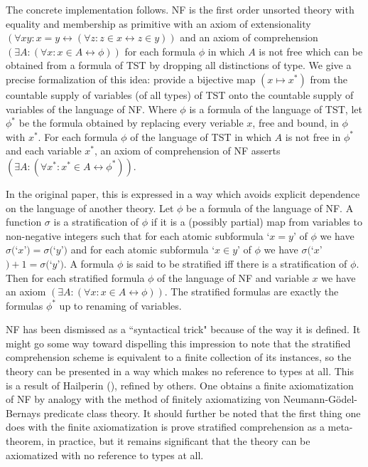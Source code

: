 \documentclass[112pt]{article}
\begin{document}
The concrete implementation follows.  NF is the first order unsorted theory with equality and membership as primitive with an axiom of extensionality $(\forall xy:x=y \leftrightarrow (\forall z:z \in x \leftrightarrow z\in y))$ and an axiom of comprehension $(\exists A:(\forall x:x \in A \leftrightarrow \phi))$ for each formula $\phi$ in which $A$ is not free which can be obtained from a formula of TST by dropping all distinctions of type.  We give a precise formalization of this idea:  provide a bijective map $(x \mapsto x^*)$ from the countable supply of variables (of all types) of TST onto the countable supply of variables of the language of NF.  Where $\phi$ is a formula of the language of TST, let $\phi^*$ be the formula obtained by replacing every veriable $x$, free and bound,
in $\phi$ with $x^*$. For each formula $\phi$ of the language of TST in which $A$ is not free in $\phi^*$ and each variable $x^*$, an axiom of comprehension of NF asserts $(\exists A:(\forall x^*:x^* \in A \leftrightarrow \phi^*))$.

In the original paper, this is expressed in a way which avoids explicit dependence on the language of another theory.  Let $\phi$ be a formula of the language of
NF.  A function $\sigma$ is a stratification of $\phi$ if it is a (possibly partial) map from variables to non-negative integers such that for each atomic subformula
`$x=y$'  of $\phi$ we have $\sigma($`$x$'$)=\sigma($`$y$'$)$ and for each atomic subformula `$x \in y$' of $\phi$ we have $\sigma($`$x$'$)+1 = \sigma($`$y$'$)$.
A formula $\phi$ is said to be stratified iff there is a stratification of $\phi$.  Then for each stratified formula $\phi$ of the language of NF and variable $x$ we have an axiom $(\exists A:(\forall x:x \in A \leftrightarrow \phi))$.  The stratified formulas are exactly the formulas $\phi^*$ up to renaming of variables.

NF has been dismissed as a ``syntactical trick" because of the way it is defined.  It might go some way toward dispelling this impression to note that the stratified comprehension scheme is equivalent to a finite collection of its instances, so the theory can be presented in a way which makes no reference to types at all.  This is a result of Hailperin (\cite{hailperin}), refined by others.  One obtains a finite axiomatization of NF by analogy with the method of finitely axiomatizing von Neumann-G\"odel-Bernays predicate class theory.  It should further be noted that the first thing one does with the finite axiomatization is prove stratified comprehension as a meta-theorem, in practice, but it remains significant that the theory can be axiomatized with no reference to types at all.
\end{document}
